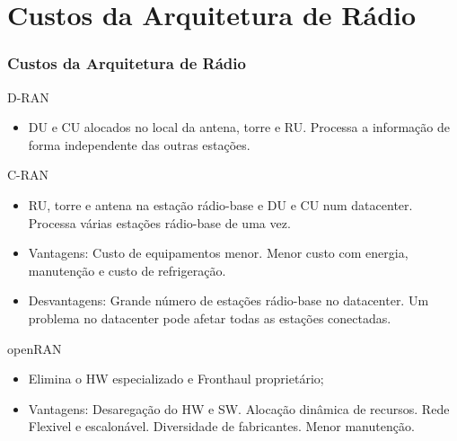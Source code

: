 \documentclass[t]{beamer}
\begin{document}
\section{Custos da Arquitetura de Rádio}
\begin{frame}
	\frametitle{Custos da Arquitetura de Rádio}
	\footnotesize
	D-RAN
	\begin{itemize}
		\item DU e CU alocados no local da antena, torre e RU. Processa a informação de forma independente das outras estações.
	\end{itemize}
	C-RAN
	\begin{itemize}
		\item RU, torre e antena na estação rádio-base e DU e CU num datacenter. Processa várias estações rádio-base de uma vez.
		\item Vantagens: Custo de equipamentos menor. Menor custo com energia, manutenção e custo de refrigeração.
		\item Desvantagens: Grande número de estações rádio-base no datacenter. Um problema no datacenter pode afetar todas as estações conectadas.
	\end{itemize}
	openRAN
	\begin{itemize}
		\item Elimina o HW especializado e Fronthaul proprietário;
		\item Vantagens: Desaregação do HW e SW. Alocação dinâmica de recursos. Rede Flexivel e escalonável. Diversidade de fabricantes. Menor manutenção.
	\end{itemize}
\end{frame}			
\end{document}
